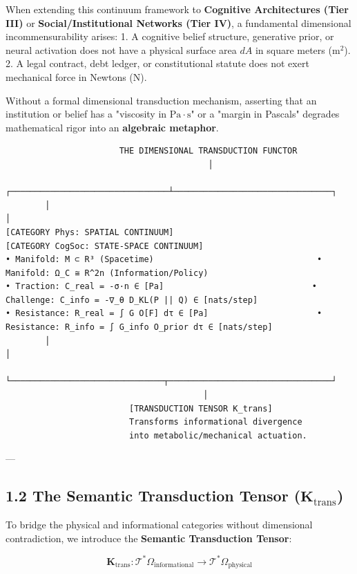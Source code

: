 \documentclass[11pt,a4paper]{article}
\theoremstyle{definition}
\theoremstyle{remark}
\begin{document}
When extending this continuum framework to \textbf{Cognitive Architectures (Tier III)} or \textbf{Social/Institutional Networks (Tier IV)}, a fundamental dimensional incommensurability arises:
1. A cognitive belief structure, generative prior, or neural activation does not have a physical surface area $dA$ in square meters ($\mathrm{m^2}$).
2. A legal contract, debt ledger, or constitutional statute does not exert mechanical force in Newtons ($\mathrm{N}$).

Without a formal dimensional transduction mechanism, asserting that an institution or belief has a "viscosity in $\mathrm{Pa \cdot s}$" or a "margin in Pascals" degrades mathematical rigor into an \textbf{algebraic metaphor}.

\begin{verbatim}
                       THE DIMENSIONAL TRANSDUCTION FUNCTOR
                                         │
        ┌────────────────────────────────┴────────────────────────────────┐
        │                                                                 │
[CATEGORY Phys: SPATIAL CONTINUUM]                             [CATEGORY CogSoc: STATE-SPACE CONTINUUM]
• Manifold: M ⊂ R³ (Spacetime)                                 • Manifold: Ω_C ≅ R^2n (Information/Policy)
• Traction: C_real = -σ·n ∈ [Pa]                              • Challenge: C_info = -∇_θ D_KL(P || Q) ∈ [nats/step]
• Resistance: R_real = ∫ G O[F] dτ ∈ [Pa]                      • Resistance: R_info = ∫ G_info O_prior dτ ∈ [nats/step]
        │                                                                 │
        └───────────────────────────────┬─────────────────────────────────┘
                                        │
                         [TRANSDUCTION TENSOR K_trans]
                         Transforms informational divergence
                         into metabolic/mechanical actuation.
\end{verbatim}

---

\subsection{1.2 The Semantic Transduction Tensor ($\mathbf{K}_{\text{trans}}$)}
To bridge the physical and informational categories without dimensional contradiction, we introduce the \textbf{Semantic Transduction Tensor}:


\begin{equation}
\mathbf{K}_{\text{trans}}: \mathcal{T}^*\Omega_{\text{informational}} \longrightarrow \mathcal{T}^*\Omega_{\text{physical}}
\end{equation}
\end{document}
